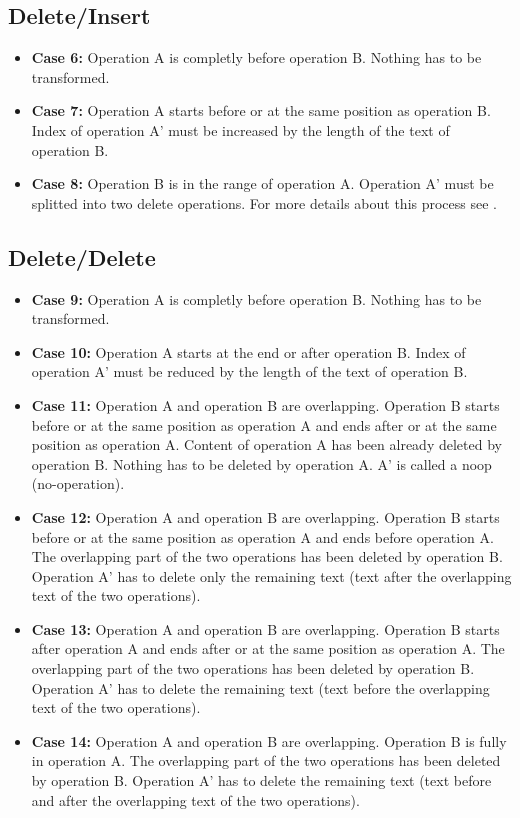 \subsection{Delete/Insert}
\begin{itemize}
\item \textbf{Case 6:}
Operation A is completly before operation B. Nothing has to be transformed.
\item \textbf{Case 7:}
Operation A starts before or at the same position as operation B. Index of operation A' must be increased by the length of the text of operation B.
\item \textbf{Case 8:}
Operation B is in the range of operation A. Operation A' must be splitted into two delete operations. For more details about this process see \cite{Split_Operation}.
\end{itemize}

\subsection{Delete/Delete}
\begin{itemize}
\item \textbf{Case 9:}
Operation A is completly before operation B. Nothing has to be transformed.
\item \textbf{Case 10:}
Operation A starts at the end or after operation B. Index of operation A' must be reduced by the length of the text of operation B.
\item \textbf{Case 11:}
Operation A and operation B are overlapping. Operation B starts before or at the same position as operation A and ends after or at the same position as operation A. Content of operation A has been already deleted by operation B. Nothing has to be deleted by operation A. A' is called a noop (no-operation).
\item \textbf{Case 12:}
Operation A and operation B are overlapping. Operation B starts before or at the same position as operation A and ends before operation A. The overlapping part of the two operations has been deleted by operation B. Operation A' has to delete only the remaining text (text after the overlapping text of the two operations).
\item \textbf{Case 13:}
Operation A and operation B are overlapping. Operation B starts after operation A and ends after or at the same position as operation A. The overlapping part of the two operations has been deleted by operation B. Operation A' has to delete the remaining text (text before the overlapping text of the two operations).
\item \textbf{Case 14:}
Operation A and operation B are overlapping. Operation B is fully in operation A. The overlapping part of the two operations has been deleted by operation B. Operation A' has to delete the remaining text (text before and after the overlapping text of the two operations).
\end{itemize}


